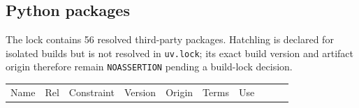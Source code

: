 \documentclass[
  letterpaper,
]{article}
\newcommand{\passthrough}[1]{#1}
\newcounter{none} %
\begin{document}
\begin{landscape}

\subsection{Python packages}\label{python-packages}

The lock contains 56 resolved third-party packages. Hatchling is declared for isolated builds but is not resolved in
\passthrough{\lstinline!uv.lock!}; its exact build version and artifact origin therefore remain \nolinkurl{NOASSERTION}
pending a build-lock decision.

{\def\LTcaptype{none} %
\begin{longtable}[]{@{}
  >{\raggedright\arraybackslash}p{}
  >{\raggedright\arraybackslash}p{}
  >{\raggedright\arraybackslash}p{}
  >{\raggedright\arraybackslash}p{}
  >{\raggedright\arraybackslash}p{}
  >{\raggedright\arraybackslash}p{}
  >{\raggedright\arraybackslash}p{}
  >{\raggedright\arraybackslash}p{}
  >{\raggedright\arraybackslash}p{}
  >{\raggedright\arraybackslash}p{}@{}}
\toprule\noalign{}
\begin{minipage}[b]{\linewidth}\raggedright
Name
\end{minipage} & \begin{minipage}[b]{\linewidth}\raggedright
Rel
\end{minipage} & \begin{minipage}[b]{\linewidth}\raggedright
Constraint
\end{minipage} & \begin{minipage}[b]{\linewidth}\raggedright
Version
\end{minipage} & \begin{minipage}[b]{\linewidth}\raggedright
Origin
\end{minipage} & \begin{minipage}[b]{\linewidth}\raggedright
Terms
\end{minipage} & \begin{minipage}[b]{\linewidth}\raggedright
Use
\end{minipage} & \begin{minipage}[b]{\linewidth}\raggedright

\end{minipage}
\end{longtable}}
\end{landscape}
\end{document}
